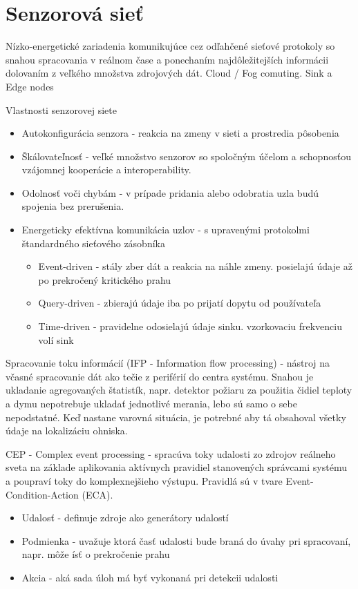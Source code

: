 \section{Senzorová sieť}
Nízko-energetické zariadenia komunikujúce cez odľahčené sieťové protokoly so snahou spracovania v reálnom čase a ponechaním najdôležitejších informácii dolovaním z veľkého množstva zdrojových dát. Cloud / Fog comuting. Sink a Edge nodes

Vlastnosti senzorovej siete
\begin{itemize}
\itemsep0em 
\item Autokonfigurácia senzora - reakcia na zmeny v sieti a prostredia pôsobenia
\item Škálovateľnosť - veľké množstvo senzorov so spoločným účelom a schopnosťou vzájomnej kooperácie a interoperability.
\item Odolnosť voči chybám - v prípade pridania alebo odobratia uzla budú spojenia bez prerušenia.
\item Energeticky efektívna komunikácia uzlov - s upravenými protokolmi štandardného sieťového zásobníka
\begin{itemize}
\itemsep0em 
\item Event-driven - stály zber dát a reakcia na náhle zmeny. posielajú údaje až po prekročený kritického prahu
\item Query-driven - zbierajú údaje iba po prijatí dopytu od používateľa
\item Time-driven - pravidelne odosielajú údaje sinku. vzorkovaciu frekvenciu volí sink
\end{itemize}
\end{itemize}
\cite{wsn-overview}

Spracovanie toku informácií (IFP - Information flow processing) - nástroj na včasné spracovanie dát ako tečie z periférií do centra systému. Snahou je ukladanie agregovaných štatistík, napr. detektor požiaru za použitia čidiel teploty a dymu nepotrebuje ukladať jednotlivé merania, lebo sú samo o sebe nepodstatné. Keď nastane varovná situácia, je potrebné aby tá obsahoval všetky údaje na lokalizáciu ohniska.

CEP - Complex event processing - spracúva toky udalosti zo zdrojov reálneho sveta na základe aplikovania aktívnych pravidiel stanovených správcami systému a poupraví toky do komplexnejšieho výstupu. Pravidlá sú v tvare Event-Condition-Action (ECA).
\begin{itemize}
\itemsep0em
\item Udalosť - definuje zdroje ako generátory udalostí
\item Podmienka - uvažuje ktorá časť udalosti bude braná do úvahy pri spracovaní, napr. môže ísť o prekročenie prahu
\item Akcia - aká sada úloh má byť vykonaná pri detekcii udalosti
\end{itemize}

